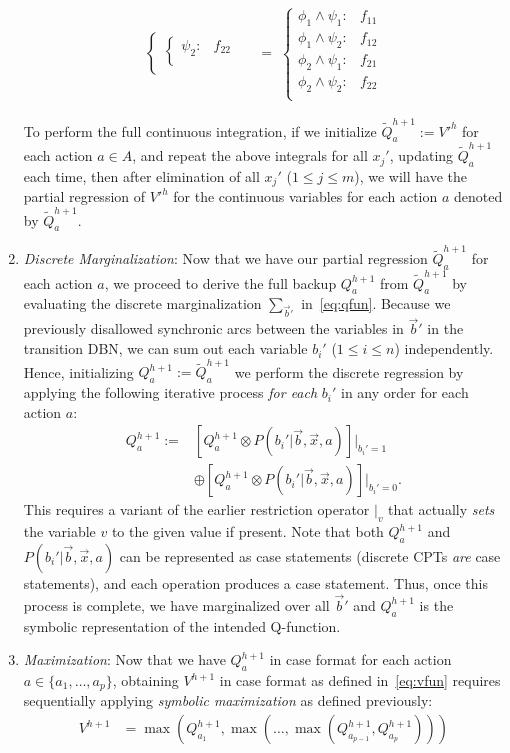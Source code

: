 \documentclass[letterpaper]{article}
\renewcommand{\-}{\text{-}}
\begin{document}
\begin{enumerate}
\begin{align*}
\begin{cases}
\begin{cases}
          \psi_2: & f_{22}  \\ 
        \end{cases} \\
    \end{cases} & \; = \;
        \begin{cases}
          \phi_1 \land \psi_1: & f_{11} \\ 
          \phi_1 \land \psi_2: & f_{12}  \\ 
          \phi_2 \land \psi_1: & f_{21} \\ 
          \phi_2 \land \psi_2: & f_{22}  \\ 
        \end{cases} 
\end{align*}

To perform the full continuous integration, 
if we initialize 
$\tilde{Q}_a^{h+1} := V'^{h}$ for each action $a \in A$, and repeat
the above integrals for all $x_j'$, updating $\tilde{Q}_a^{h+1}$ each time,
then after elimination of all $x_j'$ ($1 \leq j \leq m$), we will have 
the partial regression of $V'^{h}$ for the continuous variables for
each action $a$ denoted by $\tilde{Q}_a^{h+1}$.
\item {\it Discrete Marginalization}: Now that we have our partial
regression $\tilde{Q}_a^{h+1}$ for each action $a$, we proceed
to derive the full backup $Q_a^{h+1}$ from $\tilde{Q}_a^{h+1}$
by evaluating the discrete 
marginalization $\sum_{\vec{b}'}$ in~\eqref{eq:qfun}.
Because we previously disallowed synchronic arcs
between the variables in $\vec{b}'$ 
in the transition DBN, we can sum out each variable $b_i'$ ($1 \leq i \leq n$) 
independently.  Hence, initializing
$Q_a^{h+1} := \tilde{Q}_a^{h+1}$
we perform the discrete regression by applying the following iterative
process \emph{for each} $b_i'$ in any order
for each action $a$:
\begin{align}
Q_a^{h+1} := & \left[ Q_a^{h+1} \otimes P(b_i'|\vec{b},\vec{x},a) \right]|_{b_i' = 1} \nonumber \\
 & \oplus \left[ Q_a^{h+1} \otimes P(b_i'|\vec{b},\vec{x},a) \right]|_{b_i' = 0}.
\end{align}
This requires a variant of the earlier restriction operator $|_v$ that
actually \emph{sets} the variable $v$ to the given value if present.
Note that both $Q_a^{h+1}$ and $P(b_i'|\vec{b},\vec{x},a)$ can be represented
as case statements (discrete CPTs \emph{are} case statements), 
and each operation produces a case statement.
Thus, once this process is complete, we have marginalized over
all $\vec{b}'$ and $Q_a^{h+1}$ is the symbolic representation
of the intended Q-function.
\item {\it Maximization}: Now that we have $Q_a^{h+1}$ in
case format for each action $a \in \{a_1,\ldots,a_p\}$, obtaining
$V^{h+1}$ in case format as defined in~\eqref{eq:vfun} requires
sequentially applying
\emph{symbolic maximization} as defined previously:
\begin{align*}
V^{h+1} & = 
\max(Q_{a_1}^{h+1},\max(\ldots,\max(Q_{a_{p-1}}^{h+1},Q_{a_p}^{h+1})))
\end{align*}
\end{enumerate}
\end{document}
